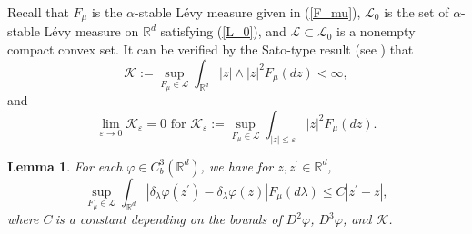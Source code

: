 \documentclass[a4paper,oneside,10pt]{article}%
\newtheorem{lemma}[theorem]{Lemma}
\numberwithin{equation}{section}
\begin{document}
Recall that $F_{\mu}$ is the $\alpha$-stable L\'{e}vy measure given in
(\ref{F_mu}), $\mathcal{L}_{0}$ is the set of $\alpha$-stable L\'{e}vy measure
on $\mathbb{R}^{d}$ satisfying (\ref{L_0}), and $\mathcal{L\subset L}_{0}$ is
a nonempty compact convex set. It can be verified by the Sato-type result (see
\cite[Remark 14.4]{Sato1999}) that
\begin{equation}
\mathcal{K}:=\sup \limits_{F_{\mu}\in \mathcal{L}}\int_{\mathbb{R}^{d}}%
|z|\wedge|z|^{2}F_{\mu}(dz)<\infty, \label{F_mu condition 1}%
\end{equation}
and
\begin{equation}
\lim_{\varepsilon \rightarrow0}\mathcal{K}_{\varepsilon}=0\text{ \ for
\ }\mathcal{K}_{\varepsilon}:=\sup \limits_{F_{\mu}\in \mathcal{L}}\int
_{|z|\leq \varepsilon}|z|^{2}F_{\mu}(dz). \label{F_mu condition 2}%
\end{equation}


\begin{lemma}
\label{Lipschitz}For each $\varphi \in C_{b}^{3}(\mathbb{R}^{d})$, we have for
$z,z^{\prime}\in \mathbb{R}^{d}$,
\[
\sup \limits_{F_{\mu}\in \mathcal{L}}\int_{\mathbb{R}^{d}}\left \vert
\delta_{\lambda}\varphi(z^{\prime})-\delta_{\lambda}\varphi \left(  z\right)
\right \vert F_{\mu}(d\lambda)\leq C|z^{\prime}-z|,
\]
where $C\ $is a constant depending on the bounds of $D^{2}\varphi$,
$D^{3}\varphi$, and $\mathcal{K}$.
\end{lemma}
\end{document}
